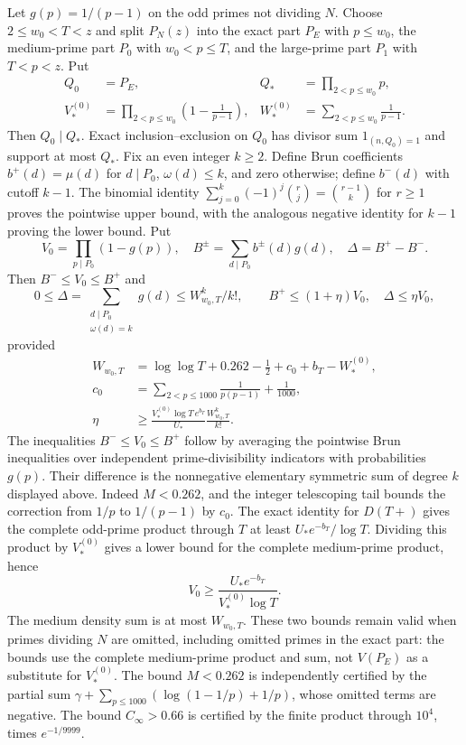 \documentclass[11pt]{article}
\newcommand{\om}{\omega}
\begin{document}
Let $g(p)=1/(p-1)$ on the odd primes not dividing $N$. Choose
$2\le w_0<T<z$ and split $P_N(z)$ into the exact part $P_E$ with
$p\le w_0$, the medium-prime part $P_0$ with $w_0<p\le T$,
and the large-prime part $P_1$ with $T<p<z$. Put
\[
\begin{aligned}
Q_0&=P_E,& Q_*&=\prod_{2<p\le w_0}p,\\
V_*^{(0)}&=\prod_{2<p\le w_0}\left(1-\frac1{p-1}\right),&
W_*^{(0)}&=\sum_{2<p\le w_0}\frac1{p-1}.
\end{aligned}
\]
Then $Q_0\mid Q_*$. Exact inclusion--exclusion on $Q_0$ has
divisor sum $1_{(n,Q_0)=1}$ and support at most $Q_*$.
Fix an even integer $k\ge2$.
Define Brun coefficients $b^+(d)=\mu(d)$ for $d\mid P_0$,
$\om(d)\le k$, and zero otherwise; define $b^-(d)$ with cutoff
$k-1$. The binomial identity
$\sum_{j=0}^k(-1)^j\binom rj=\binom{r-1}k$ for $r\ge1$
proves the pointwise upper bound, with the analogous negative identity
for $k-1$ proving the lower bound. Put
\[
V_0=\prod_{p\mid P_0}(1-g(p)),\quad
B^\pm=\sum_{d\mid P_0}b^\pm(d)g(d),\quad
\Delta=B^+-B^-.
\]
Then $B^-\le V_0\le B^+$ and
\[
0\le\Delta=\sum_{\substack{d\mid P_0\\\om(d)=k}}g(d)
\le W_{w_0,T}^k/k!,\qquad B^+\le(1+\eta)V_0,
\quad\Delta\le\eta V_0,
\]
provided
\begin{equation}\label{eq:Bruneta}
\begin{aligned}
W_{w_0,T}&=\log\log T+0.262-\frac12+c_0+b_T-W_*^{(0)},\\
c_0&=\sum_{2<p\le1000}\frac1{p(p-1)}+\frac1{1000},\\
\eta&\ge\frac{V_*^{(0)}\log T\,e^{b_T}}{U_*}
\frac{W_{w_0,T}^k}{k!}.
\end{aligned}
\end{equation}
The inequalities $B^-\le V_0\le B^+$ follow by averaging the
pointwise Brun inequalities over independent prime-divisibility
indicators with probabilities $g(p)$. Their difference is the
nonnegative elementary symmetric sum of degree $k$ displayed above.
Indeed $M<0.262$, and the integer telescoping tail bounds the
correction from $1/p$ to $1/(p-1)$ by $c_0$. The exact identity
for $D(T+)$ gives the complete odd-prime product through $T$
at least $U_*e^{-b_T}/\log T$. Dividing this product by
$V_*^{(0)}$ gives a lower bound for the complete medium-prime product,
hence
\[
V_0\ge\frac{U_*e^{-b_T}}{V_*^{(0)}\log T}.
\]
The medium density sum is at most $W_{w_0,T}$. These two bounds
remain valid when primes dividing $N$ are omitted, including omitted
primes in the exact part: the bounds use the complete medium-prime
product and sum, not $V(P_E)$ as a substitute for $V_*^{(0)}$.
The bound $M<0.262$ is independently certified by the partial sum
$\gamma+\sum_{p\le1000}(\log(1-1/p)+1/p)$, whose omitted terms
are negative. The bound $C_\infty>0.66$ is certified by the finite
product through $10^4$, times $e^{-1/9999}$.
\end{document}
